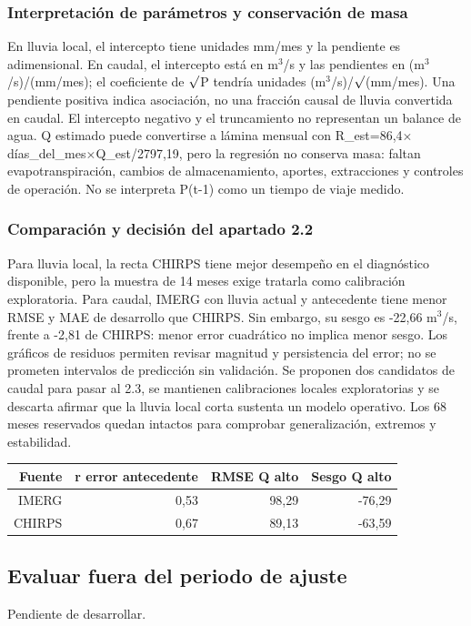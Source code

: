 \documentclass[10pt,a4paper]{article}
\begin{document}
\subsubsection*{Interpretación de parámetros y conservación de masa}
En lluvia local, el intercepto tiene unidades mm/mes y la pendiente es adimensional. En caudal, el intercepto está en m$^3$/s y las pendientes en (m$^3$/s)/(mm/mes); el coeficiente de $\sqrt{\vphantom{P}}$P tendría unidades (m$^3$/s)/$\sqrt{\vphantom{P}}$(mm/mes). Una pendiente positiva indica asociación, no una fracción causal de lluvia convertida en caudal. El intercepto negativo y el truncamiento no representan un balance de agua. Q estimado puede convertirse a lámina mensual con R\_est=86,4$\times$días\_del\_mes$\times$Q\_est/2797,19, pero la regresión no conserva masa: faltan evapotranspiración, cambios de almacenamiento, aportes, extracciones y controles de operación. No se interpreta P(t-1) como un tiempo de viaje medido.
\subsubsection*{Comparación y decisión del apartado 2.2}
Para lluvia local, la recta CHIRPS tiene mejor desempeño en el diagnóstico disponible, pero la muestra de 14 meses exige tratarla como calibración exploratoria. Para caudal, IMERG con lluvia actual y antecedente tiene menor RMSE y MAE de desarrollo que CHIRPS. Sin embargo, su sesgo es -22,66 m$^3$/s, frente a -2,81 de CHIRPS: menor error cuadrático no implica menor sesgo. Los gráficos de residuos permiten revisar magnitud y persistencia del error; no se prometen intervalos de predicción sin validación. Se proponen dos candidatos de caudal para pasar al 2.3, se mantienen calibraciones locales exploratorias y se descarta afirmar que la lluvia local corta sustenta un modelo operativo. Los 68 meses reservados quedan intactos para comprobar generalización, extremos y estabilidad.
\begin{center}\small\begin{tabular}{rrrr}\hline
Fuente & r error antecedente & RMSE Q alto & Sesgo Q alto \\ \hline
IMERG & 0,53 & 98,29 & -76,29 \\
CHIRPS & 0,67 & 89,13 & -63,59 \\
\hline\end{tabular}\end{center}
\subsection{Evaluar fuera del periodo de ajuste}
Pendiente de desarrollar.
\clearpage
\end{document}
